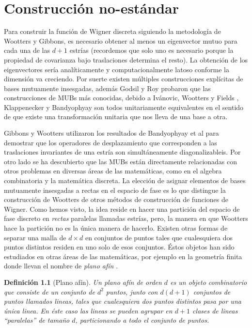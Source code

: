 \documentclass[a4paper,11pt]{report}
\newtheorem{definition}{Definición}
\begin{document}
  \chapter{Construcción no-estándar}

  Para construir la función de Wigner discreta siguiendo la
  metodología de Wootters y Gibbons, es necesario obtener
  al menos un eigenvector mutuo para cada una de las $d+1$
  estrías (recordemos que solo uno es necesario porque la
  propiedad de covarianza bajo traslaciones determina el
  resto). La obtención de los eigenvectores sería
  analíticamente y computacionalmente latoso conforme la
  dimensión va creciendo. Por suerte existen múltiples
  construcciones explícitas de bases mutuamente insesgadas,
  además Godsil y Roy \cite{godsil2009} probaron que las
  construcciones de MUBs más conocidas, debido a Ivánovic,
  Wootters y Fields \cite{wootters1989}, Klappenecker
  \cite{klappenecker2005a} y Bandyophyay
  \cite{bandyopadhyay2001} son todos unitariamente
  equivalentes en el sentido de que existe una
  transformación unitaria que nos lleva de una base a otra.

  Gibbons y Wootters utilizaron los resultados de
  Bandyophyay et al para demostrar que los operadores de
  desplazamiento que corresponden a las traslaciones
  invariantes de una estría son simultáneamente
  diagonalizableis. Por otro lado se ha descubierto que las
  MUBs están directamente relacionadas con otros problemas
  en diversas áreas de las matemáticas, como en el algebra
  combinatoria y la matemática discreta. La elección de
  asignar elementos de bases mutuamente insesgadas a rectas
  en el espacio de fase es lo que distingue la construcción
  de Wootters de otros métodos de construcción de funciones
  de Wigner. Como hemos visto, la idea reside en hacer una
  partición del espacio de fase discreto en \textit{rectas}
  paralelas llamadas estrías, pero, la manera en que
  Wootters hace la partición no es la única manera de
  hacerlo. Existen otras formas de separar una malla de $d
  \times d$ en conjuntos de puntos tales que cualesquiera
  dos puntos distintos residen en uno solo de esos
  conjuntos. Éstos objetos han sido estudiados en otras
  áreas de las matemáticas, por ejemplo en la geometría
  finita donde llevan el nombre de \textit{plano afín}
  \cite{kantor2012}. 

  \begin{definition}[Plano afín]
    Un plano afín de orden $d$ es un objeto combinatorio que
    consiste de un conjunto de $d^2$ puntos, junto con
    $d(d+1)$ conjuntos de puntos llamados \textit{lineas},
    tales que cualesquiera dos puntos distintos pasa por una
    única linea. En éste caso las lineas se pueden agrupar
    en $d+1$ clases de lineas ``paralelas'' de tamaño $d$,
    particionando a todo el conjunto de puntos. 
  \end{definition}
\end{document}
